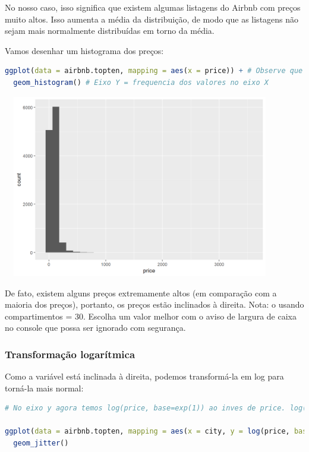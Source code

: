 \documentclass{article}
\begin{document}
No nosso caso, isso significa que existem algumas listagens do Airbnb com preços muito altos. Isso aumenta a média da distribuição, de modo que as listagens não sejam mais normalmente distribuídas em torno da média.

Vamos desenhar um histograma dos preços:

\begin{lstlisting}[language=R]
ggplot(data = airbnb.topten, mapping = aes(x = price)) + # Observe que nao temos mais uma cidade x =. O preco deve estar no eixo X e as frequencias dos precos devem estar no eixo Y
  geom_histogram() # Eixo Y = frequencia dos valores no eixo X
\end{lstlisting}


\begin{center}
\includegraphics[width=12cm,height=8cm]{intro_histogram-1.png}
\end{center}

De fato, existem alguns preços extremamente altos (em comparação com a maioria dos preços), portanto, os preços estão inclinados à direita. Nota: o  usando compartimentos = 30. Escolha um valor melhor com o aviso de largura de caixa no console que possa ser ignorado com segurança.

\newpage
\subsubsection{Transformação logarítmica}

Como a variável  está inclinada à direita, podemos transformá-la em log para torná-la mais normal:

\begin{lstlisting}[language=R]
# No eixo y agora temos log(price, base=exp(1)) ao inves de price. log(price, base=exp(1)) = assuma o log natural, i.e., o log com base = exp(1) = e.

ggplot(data = airbnb.topten, mapping = aes(x = city, y = log(price, base=exp(1)))) + 
  geom_jitter()
\end{lstlisting}
\end{document}
